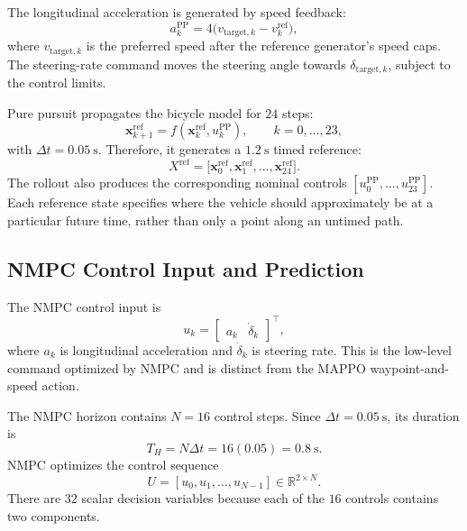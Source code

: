 \documentclass[letterpaper,10pt,conference]{ieeeconf}
\begin{document}
The longitudinal acceleration is generated by speed feedback:
\begin{equation}
    a_k^{\mathrm{PP}} = 4\bigl(v_{\mathrm{target},k}-v_k^{\mathrm{ref}}\bigr),
\end{equation}
where $v_{\mathrm{target},k}$ is the preferred speed after the reference
generator's speed caps. The steering-rate command moves the steering angle
towards $\delta_{\mathrm{target},k}$, subject to the control limits.

Pure pursuit propagates the bicycle model for $24$ steps:
\begin{equation}
    \mathbf{x}_{k+1}^{\mathrm{ref}}
    = f(\mathbf{x}_k^{\mathrm{ref}},u_k^{\mathrm{PP}}),
    \qquad k=0,\ldots,23,
\end{equation}
with $\Delta t=0.05~\mathrm{s}$. Therefore, it generates a
$1.2~\mathrm{s}$ timed reference:
\begin{equation}
    X^{\mathrm{ref}}
    = \bigl[\mathbf{x}_0^{\mathrm{ref}},
             \mathbf{x}_1^{\mathrm{ref}},\ldots,
             \mathbf{x}_{24}^{\mathrm{ref}}\bigr].
\end{equation}
The rollout also produces the corresponding nominal controls
$[u_0^{\mathrm{PP}},\ldots,u_{23}^{\mathrm{PP}}]$.
Each reference state specifies where the vehicle should approximately be
at a particular future time, rather than only a point along an untimed path.

\subsection{NMPC Control Input and Prediction}

The NMPC control input is
\begin{equation}
    u_k = \begin{bmatrix}a_k & \dot{\delta}_k\end{bmatrix}^{\!\top},
\end{equation}
where $a_k$ is longitudinal acceleration and $\dot{\delta}_k$ is steering
rate. This is the low-level command optimized by NMPC and is distinct from
the MAPPO waypoint-and-speed action.

The NMPC horizon contains $N=16$ control steps. Since
$\Delta t=0.05~\mathrm{s}$, its duration is
\begin{equation}
    T_H=N\Delta t=16(0.05)=0.8~\mathrm{s}.
\end{equation}
NMPC optimizes the control sequence
\begin{equation}
    U=[u_0,u_1,\ldots,u_{N-1}]\in\mathbb{R}^{2\times N}.
\end{equation}
There are $32$ scalar decision variables because each of the $16$ controls
contains two components.
\end{document}
